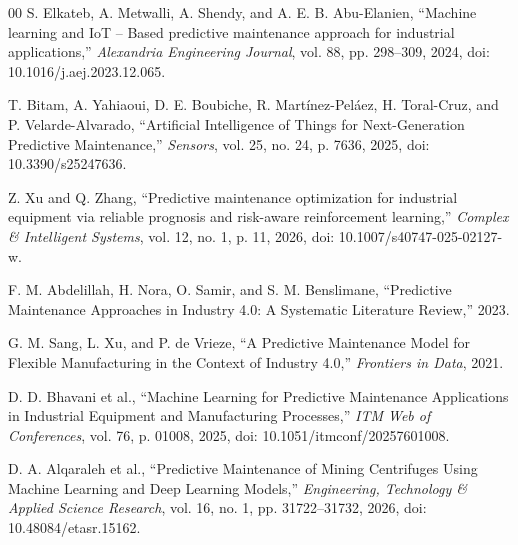 \documentclass[conference]{IEEEtran}
\begin{document}
\begin{thebibliography}{00}
S. Elkateb, A. Metwalli, A. Shendy, and A. E. B. Abu-Elanien, ``Machine learning and IoT – Based predictive maintenance approach for industrial applications,'' \textit{Alexandria Engineering Journal}, vol. 88, pp. 298--309, 2024, doi: 10.1016/j.aej.2023.12.065.

T. Bitam, A. Yahiaoui, D. E. Boubiche, R. Martínez-Peláez, H. Toral-Cruz, and P. Velarde-Alvarado, ``Artificial Intelligence of Things for Next-Generation Predictive Maintenance,'' \textit{Sensors}, vol. 25, no. 24, p. 7636, 2025, doi: 10.3390/s25247636.

Z. Xu and Q. Zhang, ``Predictive maintenance optimization for industrial equipment via reliable prognosis and risk-aware reinforcement learning,'' \textit{Complex \& Intelligent Systems}, vol. 12, no. 1, p. 11, 2026, doi: 10.1007/s40747-025-02127-w.

F. M. Abdelillah, H. Nora, O. Samir, and S. M. Benslimane, ``Predictive Maintenance Approaches in Industry 4.0: A Systematic Literature Review,'' 2023.

G. M. Sang, L. Xu, and P. de Vrieze, ``A Predictive Maintenance Model for Flexible Manufacturing in the Context of Industry 4.0,'' \textit{Frontiers in Data}, 2021.

D. D. Bhavani et al., ``Machine Learning for Predictive Maintenance Applications in Industrial Equipment and Manufacturing Processes,'' \textit{ITM Web of Conferences}, vol. 76, p. 01008, 2025, doi: 10.1051/itmconf/20257601008.



D. A. Alqaraleh et al., ``Predictive Maintenance of Mining Centrifuges Using Machine Learning and Deep Learning Models,'' \textit{Engineering, Technology \& Applied Science Research}, vol. 16, no. 1, pp. 31722--31732, 2026, doi: 10.48084/etasr.15162.

\end{thebibliography}
\end{document}
